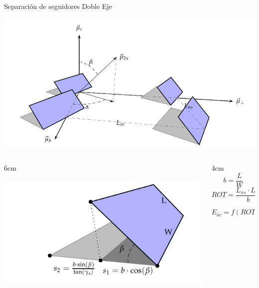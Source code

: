 \documentclass[xcolor={usenames,svgnames,dvipsnames}]{beamer}
\begin{document}
\begin{frame}[label={sec:org2e4ae37}]{Separación de seguidores Doble Eje}
\begin{center}
\includegraphics[height=0.5\textheight]{../figs/Sombras2X.pdf}
\end{center}

\begin{columns}
\begin{column}{6cm\columnwidth}
\begin{center}
\includegraphics[width=.9\linewidth]{../figs/DimensionesSeguidorSombra.pdf}
\end{center}
\end{column}

\begin{column}{4cm\columnwidth}
$$b=\frac{L}{W}$$ 
$$ROT=\frac{L_{ns}\cdot L_{eo}}{b}$$

$$E_{ac}=f(ROT)??$$
\end{column}
\end{columns}
\end{frame}
\end{document}
